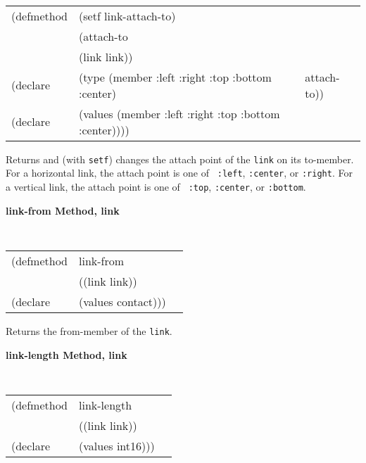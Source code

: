 {\samepage
\begin{flushright} \parbox[t]{6.125in}{
\tt
\begin{tabular}{lll}
\raggedright
(defmethod & (setf link-attach-to) & \\
         & (attach-to \\
         & (link link)) \\
(declare &(type (member :left :right :top :bottom :center) & attach-to))\\
(declare &(values (member :left :right :top :bottom :center))))
\end{tabular}
\rm
}
\end{flushright}}


\begin{flushright} \parbox[t]{6.125in}{
Returns and (with {\tt setf}) changes the attach point of the {\tt link} on
its to-member. For a horizontal link, the attach point is one of {\tt
:left}, {\tt :center}, or {\tt :right}. For a vertical link, the attach point is one of {\tt
:top}, {\tt :center}, or {\tt :bottom}.

}\end{flushright}

{\samepage
{\large {\bf link-from \hfill Method, link}}
\begin{flushright} \parbox[t]{6.125in}{
\tt
\begin{tabular}{lll}
\raggedright
(defmethod & link-from & \\
           & ((link  link)) \\
(declare   & (values contact)))
\end{tabular}
\rm

}\end{flushright}}

\begin{flushright} \parbox[t]{6.125in}{
Returns the from-member of the {\tt link}.

}\end{flushright}


{\samepage
{\large {\bf link-length \hfill Method, link}}
\begin{flushright} \parbox[t]{6.125in}{
\tt
\begin{tabular}{lll}
\raggedright
(defmethod & link-length & \\
           & ((link  link)) \\
(declare   & (values int16)))
\end{tabular}
\rm

}\end{flushright}}

